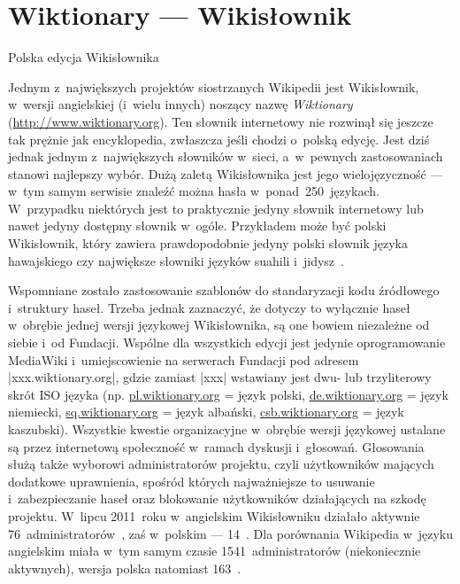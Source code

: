 \section{Wiktionary --- Wikisłownik}
\begin{illustration}
	\caption{Polska edycja Wikisłownika}
\end{illustration}
Jednym z~największych projektów siostrzanych Wikipedii jest Wikisłownik, w~wersji angielskiej (i~wielu innych) noszący nazwę \emph{Wiktionary} (\url{http://www.wiktionary.org}). Ten słownik internetowy nie rozwinął się jeszcze tak prężnie jak encyklopedia, zwłaszcza jeśli chodzi o~polską edycję. Jest dziś jednak jednym z~największych słowników w~sieci, a~w~pewnych zastosowaniach stanowi najlepszy wybór. Dużą zaletą Wikisłownika jest jego wielojęzyczność --- w~tym samym serwisie znaleźć można hasła w~ponad~250~językach. W~przypadku niektórych jest to praktycznie jedyny słownik internetowy lub nawet jedyny dostępny słownik w~ogóle. Przykładem może być polski Wikisłownik, który zawiera prawdopodobnie jedyny polski słownik języka hawajskiego czy największe słowniki języków suahili i~jidysz~\cite{wikt:dlaczego}.

Wspomniane zostało zastosowanie szablonów do standaryzacji kodu źródłowego i~struktury haseł. Trzeba jednak zaznaczyć, że dotyczy to wyłącznie haseł w~obrębie jednej wersji językowej Wikisłownika, są one bowiem niezależne od siebie i~od Fundacji. Wspólne dla wszystkich edycji jest jedynie oprogramowanie MediaWiki i~umiejscowienie na serwerach Fundacji pod adresem \kod|xxx.wiktionary.org|, gdzie zamiast \kod|xxx| wstawiany jest dwu- lub trzyliterowy skrót ISO języka (np. \url{pl.wiktionary.org} = język polski, \url{de.wiktionary.org} = język niemiecki, \url{sq.wiktionary.org} = język albański, \url{csb.wiktionary.org} = język kaszubski). Wszystkie kwestie organizacyjne w~obrębie wersji językowej ustalane są przez internetową społeczność w~ramach dyskusji i~głosowań. Głosowania służą także wyborowi administratorów projektu, czyli użytkowników mających dodatkowe uprawnienia, spośród których najważniejsze to usuwanie i~zabezpieczanie haseł oraz blokowanie użytkowników działających na szkodę projektu. W~lipcu 2011~roku w~angielskim Wikisłowniku działało aktywnie 76~administratorów~\cite{enwikt:admin}, zaś w~polskim --- 14~\cite{wikt:admin}. Dla porównania Wikipedia w~języku angielskim miała w~tym samym czasie 1541~administratorów (niekoniecznie aktywnych), wersja polska natomiast 163~\cite{wiki:admin}.

